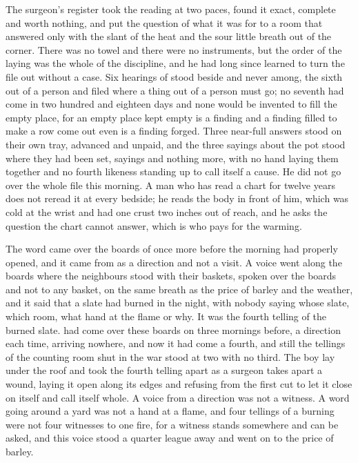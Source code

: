 The surgeon's register took the reading at two paces, found it exact, complete and worth nothing, and put the question of what it was for to a room that answered only with the slant of the heat and the sour little breath out of the corner. There was no towel and there were no instruments, but the order of the laying was the whole of the discipline, and he had long since learned to turn the file out without a case. Six hearings of  stood beside and never among, the sixth out of a person and filed where a thing out of a person must go; no seventh had come in two hundred and eighteen days and none would be invented to fill the empty place, for an empty place kept empty is a finding and a finding filled to make a row come out even is a finding forged. Three near-full answers stood on their own tray, advanced and unpaid, and the three sayings about the pot stood where they had been set, sayings and nothing more, with no hand laying them together and no fourth likeness standing up to call itself a cause. He did not go over the whole file this morning. A man who has read a chart for twelve years does not reread it at every bedside; he reads the body in front of him, which was cold at the wrist and had one crust two inches out of reach, and he asks the question the chart cannot answer, which is who pays for the warming.

\scenebreak

The word came over the boards of  once more before the morning had properly opened, and it came from  as a direction and not a visit. A voice went along the boards where the neighbours stood with their baskets, spoken over the boards and not to any basket, on the same breath as the price of barley and the weather, and it said that a slate had burned in the night, with nobody saying whose slate, which room, what hand at the flame or why. It was the fourth telling of the burned slate.  had come over these boards on three mornings before, a direction each time, arriving nowhere, and now it had come a fourth, and still the tellings of the counting room shut in the war stood at two with no third. The boy lay under the roof and took the fourth telling apart as a surgeon takes apart a wound, laying it open along its edges and refusing from the first cut to let it close on itself and call itself whole. A voice from a direction was not a witness. A word going around a yard was not a hand at a flame, and four tellings of a burning were not four witnesses to one fire, for a witness stands somewhere and can be asked, and this voice stood a quarter league away and went on to the price of barley.

